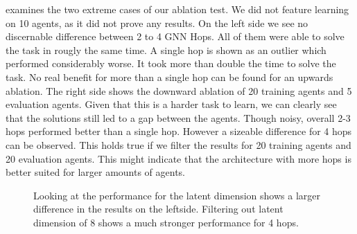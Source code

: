  examines the two extreme cases of our ablation test. We did not feature learning on 10 agents, as it did not prove any results. On the left side we see no discernable difference between 2 to 4 GNN Hops. All of them were able to solve the task in rougly the same time. A single hop is shown as an outlier which performed considerably worse. It took more than double the time to solve the task. No real benefit for more than a single hop can be found for an upwards ablation. The right side shows the downward ablation of 20 training agents and 5 evaluation agents. Given that this is a harder task to learn, we can clearly see that the solutions still led to a gap between the agents. Though noisy, overall 2-3 hops performed better than a single hop. However a sizeable difference for 4 hops can be observed. This holds true if we filter the results for 20 training agents and 20 evaluation agents. This might indicate that the architecture with more hops is better suited for larger amounts of agents. 

\begin{figure}[htp]
    \centering
    \hspace{1cm}                       
    \caption{Looking at the performance for the latent dimension shows a larger difference in the results on the leftside. Filtering out latent dimension of 8 shows a much stronger performance for 4 hops.}
    \label{fig:ablation-ld-no-ld8}
\end{figure}

